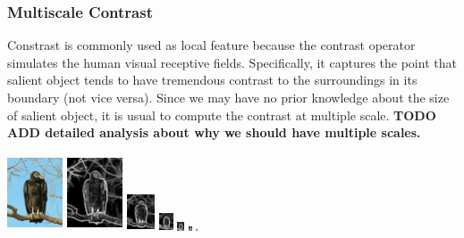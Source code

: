 \documentclass[10pt,twocolumn,letterpaper]{article}
\newcommand{\BOLD}{\textbf}
\begin{document}
\subsubsection{Multiscale Contrast}

Constrast is commonly used as local feature because the contrast operator simulates the human visual receptive fields. Specifically, it captures the point that salient object tends to have tremendous contrast to the surroundings in its boundary (not vice versa). Since we may have no prior knowledge about the size of salient object, it is usual to compute the contrast at multiple scale. 
\BOLD{TODO ADD detailed analysis about why we should have multiple scales.}

    \begin{center}    
        \includegraphics[width=0.65in,height=0.9in]{./Figures/pyramid/5_145_145839raw.jpg} \hspace{2mm}
    \includegraphics[width=0.65in,height=0.9in]{./Figures/pyramid/5_145_145839_p0.jpg} 
    \includegraphics[width=0.325in,height=0.45in]{./Figures/pyramid/5_145_145839_p1.jpg} 
    \includegraphics[width=0.1625in,height=0.225in]{./Figures/pyramid/5_145_145839_p2.jpg} 
    \includegraphics[width=0.08125in,height=0.1125in]{./Figures/pyramid/5_145_145839_p3.jpg} 
    \includegraphics[width=0.040625in,height=0.0575in]{./Figures/pyramid/5_145_145839_p4.jpg} 
    \includegraphics[width=0.0203125in,height=0.02825in]{./Figures/pyramid/5_145_145839_p5.jpg} \hspace{1mm}

\end{center}
\end{document}
